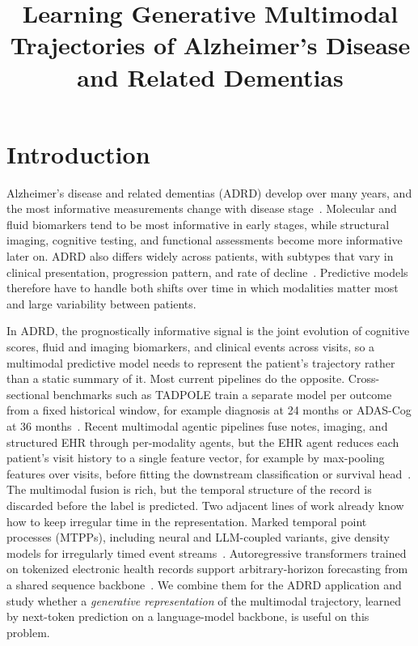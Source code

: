 \documentclass{article}
\title{Learning Generative Multimodal Trajectories of Alzheimer's Disease and Related Dementias}
\author{%
}
\begin{document}
\maketitle


\begin{abstract}

\end{abstract}



\section{Introduction}
\label{sec:intro}

Alzheimer's disease and related dementias (ADRD) develop over many years, and the most informative measurements change with disease stage~\citep{self2023emerging}.
Molecular and fluid biomarkers tend to be most informative in early stages, while structural imaging, cognitive testing, and functional assessments become more informative later on.
ADRD also differs widely across patients, with subtypes that vary in clinical presentation, progression pattern, and rate of decline~\citep{young2018uncovering,fereshtehnejad2015new}.
Predictive models therefore have to handle both shifts over time in which modalities matter most and large variability between patients.

In ADRD, the prognostically informative signal is the joint evolution of cognitive scores, fluid and imaging biomarkers, and clinical events across visits, so a multimodal predictive model needs to represent the patient's trajectory rather than a static summary of it. Most current pipelines do the opposite. Cross-sectional benchmarks such as TADPOLE train a separate model per outcome from a fixed historical window, for example diagnosis at 24 months or ADAS-Cog at 36 months~\citep{marinescu2019tadpole}. Recent multimodal agentic pipelines fuse notes, imaging, and structured EHR through per-modality agents, but the EHR agent reduces each patient's visit history to a single feature vector, for example by max-pooling features over visits, before fitting the downstream classification or survival head~\citep{liu2026multidisciplinary}. The multimodal fusion is rich, but the temporal structure of the record is discarded before the label is predicted.
Two adjacent lines of work already know how to keep irregular time in the representation.
Marked temporal point processes (MTPPs), including neural and LLM-coupled variants, give density models for irregularly timed event streams~\citep{kong2025language,liu2025tpp,li2026longrange,berghaus2026incontext}.
Autoregressive transformers trained on tokenized electronic health records support arbitrary-horizon forecasting from a shared sequence backbone~\citep{renc2024zero,renc2025foundation}.
We combine them for the ADRD application and study whether a \emph{generative representation} of the multimodal trajectory, learned by next-token prediction on a language-model backbone, is useful on this problem.
\end{document}
